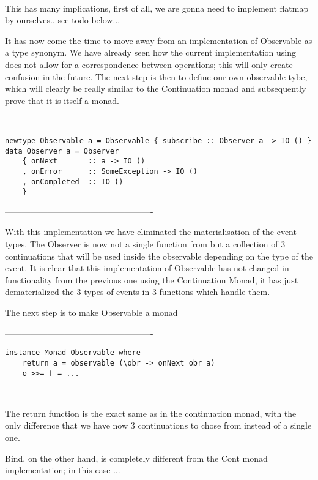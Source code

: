 \\

This has many implications, first of all, we are gonna need to implement flatmap by ourselves.. see todo below...

It has now come the time to move away from an implementation of Observable as a type synonym. We have already seen how the current implementation using  does not allow for a correspondence between \code{>>=} operations; this will only create confusion in the future. The next step is then to define our own observable tybe, which will clearly be really similar to the Continuation monad and subsequently prove that it is itself a monad. 

----------------------------------------------------
\begin{verbatim}
newtype Observable a = Observable { subscribe :: Observer a -> IO () } 
data Observer a = Observer 
    { onNext       :: a -> IO ()
    , onError      :: SomeException -> IO ()
    , onCompleted  :: IO ()
    }
\end{verbatim}
----------------------------------------------------    

With this implementation we have eliminated the materialisation of the event types. The Observer is now not a single function from  but a collection of 3 continuations that will be used inside the observable depending on the type of the event. It is clear that this implementation of Observable has not changed in functionality from the previous one using the Continuation Monad, it has just dematerialized the 3 types of events in 3 functions which handle them.

The next step is to make Observable a monad

----------------------------------------------------
\begin{verbatim}
instance Monad Observable where
	return a = observable (\obr -> onNext obr a)
	o >>= f = ...
\end{verbatim}
----------------------------------------------------  

The return function is the exact same as in the continuation monad, with the only difference that we have now 3 continuations to chose from instead of a single one. 

Bind, on the other hand, is completely different from the Cont monad implementation; in this case ... 

